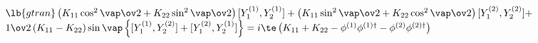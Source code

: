 \begin{equation}
\begin{array}{l}
\lb{gtran}
\left( K_{11} \cos^2{\vap\ov 2}+ K_{22} \sin^2{\vap\ov 2} \right)
[Y_{1}^{(1)}, Y_{2}^{(1)}] +  \left( K_{11} \sin^2{\vap\ov 2}
+ K_{22} \cos^2{\vap\ov 2}\right) [Y_{1}^{(2)}, Y_{2}^{(2)}] +\\
{1\ov 2}\left(K_{11} - K_{22}\right) \sin{\vap}
\left\{ [Y_{1}^{(1)}, Y_{2}^{(2)}] + [Y_{1}^{(2)}, Y_{2}^{(1)}] \right\}
= i\te \left( K_{11} + K_{22} - \phi^{(1)} \phi^{(1)\dag} 
- \phi^{(2)} \phi^{(2)\dag} \right)
\end{array}
\end{equation}

